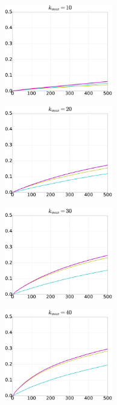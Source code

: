 \documentclass[dvipdfmx]{ampbt}
\begin{document}
   \begin{figure}[htbp]
    \begin{minipage}{0.33\hsize}
     \begin{center}
      \includegraphics[width=47mm]{../fig/cml_10clip.eps}
     \end{center}
     \label{fig:11}
    \end{minipage}\begin{minipage}{0.33\hsize}
     \begin{center}
      \includegraphics[width=47mm]{../fig/cml_20clip.eps}
     \end{center}
     \label{fig:12}
    \end{minipage}\begin{minipage}{0.33\hsize}
     \begin{center}
      \includegraphics[width=47mm]{../fig/cml_30clip.eps}
     \end{center}
     \label{fig:13}
    \end{minipage}
    \begin{minipage}{0.33\hsize}
     \begin{center}
      \includegraphics[width=47mm]{../fig/cml_40clip.eps}

\end{center}
\end{minipage}
\end{figure}
\end{document}
